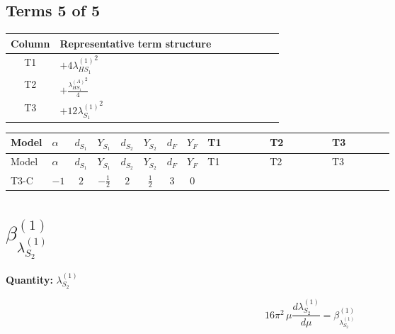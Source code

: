 \documentclass[8pt]{article}
\begin{document}
\begin{landscape}
\subsection*{Terms 5 of 5}
\begin{center}
\begin{tabular}{@{}c >{\raggedright\arraybackslash}p{0.82\linewidth}@{}}
\toprule
Column & Representative term structure \\
\midrule
T1 & \(\displaystyle +4 {\lambda_{HS_1}^{(1)}}^2\) \\
\midrule
T2 & \(\displaystyle +\frac{{\lambda_{HS_1}^{(A)}}^2}{4}\) \\
\midrule
T3 & \(\displaystyle +12 {\lambda_{S_1}^{(1)}}^2\) \\
\midrule
\bottomrule
\end{tabular}
\end{center}
\smallskip
\tiny
\begin{longtable}{@{}llcccccc >{\raggedright\arraybackslash}p{0.21\linewidth} >{\raggedright\arraybackslash}p{0.21\linewidth} >{\raggedright\arraybackslash}p{0.21\linewidth}@{}}
\toprule
Model & $\alpha$ & $d_{S_1}$ & $Y_{S_1}$ & $d_{S_2}$ & $Y_{S_2}$ & $d_F$ & $Y_F$ & T1 & T2 & T3 \\
\midrule
\endfirsthead
\toprule
Model & $\alpha$ & $d_{S_1}$ & $Y_{S_1}$ & $d_{S_2}$ & $Y_{S_2}$ & $d_F$ & $Y_F$ & T1 & T2 & T3 \\
\midrule
\endhead
T3-C & $-1$ & $2$ & $-\frac{1}{2}$ & $2$ & $\frac{1}{2}$ & $3$ & $0$ & \scriptsize\adjustbox{max width=\linewidth}{$\begin{gathered} +4 {\lambda_{HS_1}^{(1)}}^2\end{gathered}$} & \scriptsize\adjustbox{max width=\linewidth}{$\begin{gathered} +\frac{{\lambda_{HS_1}^{(A)}}^2}{4}\end{gathered}$} & \scriptsize\adjustbox{max width=\linewidth}{$\begin{gathered} +12 {\lambda_{S_1}^{(1)}}^2\end{gathered}$} \\
\midrule
\bottomrule
\end{longtable}
\clearpage
\section*{$\beta_{\lambda_{S_2}^{(1)}}^{(1)}$}
\noindent\textbf{Quantity: }$\lambda_{S_2}^{(1)}$\par\smallskip
\[16\pi^2\,\mu\frac{d \lambda_{S_2}^{(1)}}{d\mu}=\beta_{\lambda_{S_2}^{(1)}}^{(1)}\]

\end{landscape}
\end{document}
